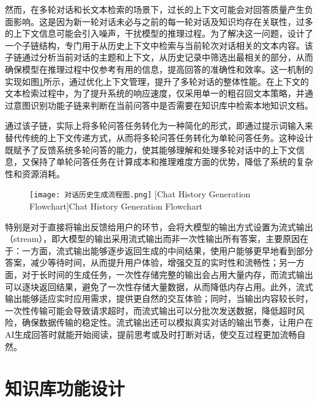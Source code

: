 然而，在多轮对话和长文本检索的场景下，过长的上下文可能会对回答质量产生负面影响。这是因为新一轮对话未必与之前的每一轮对话及知识均存在关联性，过多的上下文信息可能会引入噪声，干扰模型的推理过程。为了解决这一问题，设计了一个子链结构，专门用于从历史上下文中检索与当前轮次对话相关的文本内容。该子链通过分析当前对话的主题和上下文，从历史记录中筛选出最相关的部分，从而确保模型在推理过程中仅参考有用的信息，提高回答的准确性和效率。这一机制的实现如图\ref{fig:多轮对话}所示，通过优化上下文管理，提升了多轮对话的整体性能。在上下文的文本检索过程中，为了提升系统的响应速度，仅采用单一的粗召回文本策略，并通过意图识别功能子链来判断在当前问答中是否需要在知识库中检索本地知识文档。

通过该子链，实际上将多轮问答任务转化为一种简化的形式，即通过提示词输入来替代传统的上下文传递方式，从而将多轮问答任务转化为单轮问答任务。这种设计既赋予了反馈系统多轮问答的能力，使其能够理解和处理多轮对话中的上下文信息，又保持了单轮问答任务在计算成本和推理难度方面的优势，降低了系统的复杂性和资源消耗。

\begin{figure}[!htb]
    \centering
    \texttt{[image: 对话历史生成流程图.png]}
    [Chat History Generation Flowchart]{Chat History Generation Flowchart}
    \label{fig:多轮对话}
\end{figure}
特别是对于直接将输出反馈给用户的环节，会将大模型的输出方式设置为流式输出（stream），即大模型的输出采用流式输出而非一次性输出所有答案，主要原因在于：一方面，流式输出能够逐步返回生成的中间结果，使用户能够更早地看到部分答案，减少等待时间，从而提升用户体验，增强交互的实时性和流畅性；另一方面，对于长时间的生成任务，一次性存储完整的输出会占用大量内存，而流式输出可以逐块返回结果，避免了一次性存储大量数据，从而降低内存占用。此外，流式输出能够适应实时应用需求，提供更自然的交互体验；同时，当输出内容较长时，一次性传输可能会导致请求超时，而流式输出可以分批次发送数据，降低超时风险，确保数据传输的稳定性。流式输出还可以模拟真实对话的输出节奏，让用户在AI生成回答时就能开始阅读，提前思考或及时打断对话，使交互过程更加流畅自然。

\section{知识库功能设计}

